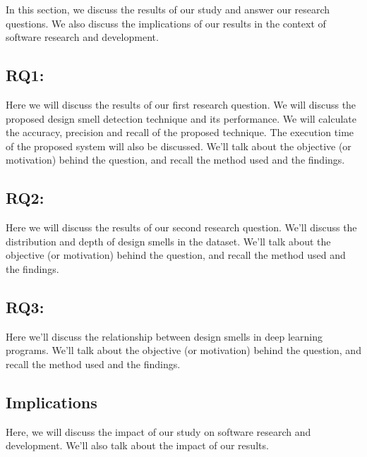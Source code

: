 \label{sec:discussion}
In this section, we discuss the results of our study and answer our research questions. We also discuss the implications of our results in the context of software research and development.

\subsection{RQ1:\RQOne}
\label{rq1}

Here we will discuss the results of our first research question. We will discuss
the proposed design smell detection technique and its performance. We will
calculate the accuracy, precision and recall of the proposed technique. The
execution time of the proposed system will also be discussed. We'll talk about
the objective (or motivation) behind the question, and recall the method used and the findings.





\subsection{RQ2:\RQTwo}
\label{rq2}

Here we will discuss the results of our second research question. We'll discuss the distribution and depth of design smells in the dataset. We'll talk about the objective (or motivation) behind the question, and recall the method used and the findings.



\subsection{RQ3:\RQThree}
\label{rq3}

Here we'll discuss the relationship between design smells in deep learning programs. We'll talk about the objective (or motivation) behind the question, and recall the method used and the findings.






\subsection{Implications}
\label{implications}
Here, we will discuss the impact of our study on software research and development. We'll also talk about the impact of our results.




